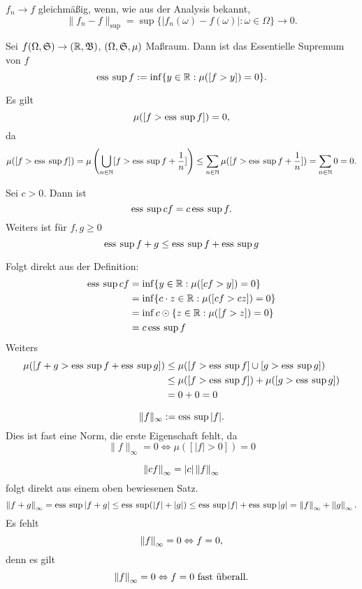 			\begin{bem}
				$f_n\to f$ gleichmäßig, wenn, wie aus der Analysis bekannt,
				\[ \lVert f_n-f\lVert_{\sup}=\sup\{|f_n(\omega)-f(\omega)|:\omega\in\Omega\}\to0. \]
			\end{bem}
			
			\begin{defi}
				Sei $f(\Omega,\mathfrak{S})\to(\mathbb{R},\mathfrak{B})$, $(\Omega,\mathfrak{S},\mu)$ Maßraum. Dann ist das Essentielle Supremum von $f$
				\[ \operatorname{ess\:\sup} f:=\inf\{y\in\mathbb{R}:\mu([f>y])=0\}. \]
			\end{defi}
			
			\begin{bem}
				Es gilt
				\[ \mu([f>\operatorname{ess\:\sup} f])=0, \]
				da
				\[ \mu([f>\operatorname{ess\:\sup} f])=\mu\left(\bigcup_{n\in\mathbb{N}} [f>\operatorname{ess\:\sup} f+\frac{1}{n}]\right)\le \sum_{n\in\mathbb{N}} \mu([f>\operatorname{ess\:\sup} f+\frac{1}{n}])=\sum_{n\in\mathbb{N}}0=0. \]
			\end{bem}
			
			\begin{satz}
				Sei $c>0$. Dann ist
				\[ \operatorname{ess\:\sup} cf=c\operatorname{ess\:\sup} f. \]
				Weiters ist für $f,g\ge 0$
				\[ \operatorname{ess\:\sup} f+g\le \operatorname{ess\:\sup} f+\operatorname{ess\:\sup} g \]
			\end{satz}
			\begin{bew}
				Folgt direkt aus der Definition:
				\begin{align*} \operatorname{ess\:\sup} cf&=\inf\{y\in\mathbb{R}: \mu([cf>y])=0\}\\&=\inf\{c\cdot z\in\mathbb{R}: \mu([cf>cz])=0\}\\&=\inf c\odot \{z\in\mathbb{R}: \mu([f>z])=0\}\\&=c\operatorname{ess\:\sup} f \end{align*}
				Weiters
				\begin{align*} \mu([f+g> \operatorname{ess\:\sup} f+\operatorname{ess\:\sup} g])&\le \mu([f>\operatorname{ess\:\sup} f]\cup[g>\operatorname{ess\:\sup} g])\\&\le\mu([f>\operatorname{ess\:\sup} f])+\mu([g>\operatorname{ess\:\sup} g])\\&=0+0=0 \end{align*}
			\end{bew}
			
			\begin{defi}
				\[ \lVert f\rVert_\infty :=\operatorname{ess\:\sup} |f|. \]
				Dies ist fast eine Norm, die erste Eigenschaft fehlt, da
				\[ \lVert f\rVert_\infty=0\Leftrightarrow \mu([|f|>0])=0 \]
			\end{defi}
			
			\begin{bew}
				\[ \left\|cf\right\|_\infty=|c|\left\|f\right\|_\infty \]
				folgt direkt aus einem oben bewiesenen Satz.
				\[ \left\|f+g\right\|_\infty=\operatorname{ess\:\sup}|f+g|\le\operatorname{ess\:\sup}(|f|+|g|)\le \operatorname{ess\:\sup}|f|+\operatorname{ess\:\sup}|g|=\left\|f\right\|_\infty+\left\|g\right\|_\infty. \]
				Es fehlt 
				\[ \left\|f\right\|_\infty=0\Leftrightarrow f=0, \]
				denn es gilt
				\[ \left\|f\right\|_\infty=0\Leftrightarrow f=0 \text{ fast überall.} \]
			\end{bew}
			
